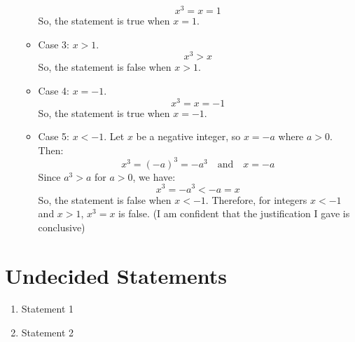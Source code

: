 \documentclass{article}
\begin{document}
\begin{enumerate}
\begin{itemize}
                    \[
                        x^3 = x = 1
                    \]
                    So, the statement is true when $x = 1$.
              \item Case 3: $x > 1$.
                    \[
                        x^3 > x
                    \]
                    So, the statement is false when $x > 1$.
              \item Case 4: $x = -1$.
                    \[
                        x^3 = x = -1
                    \]
                    So, the statement is true when $x = -1$.
              \item Case 5: $x < -1$.
                    Let \(x\) be a negative integer, so \(x = -a\) where \(a > 0\).
                    Then:
                    \[
                        x^3 = {(-a)}^3 = -a^3 \quad \text{and} \quad x = -a
                    \]
                    Since \(a^3 > a\) for \(a > 0\), we have:
                    \[
                        x^3 = -a^3 < -a = x
                    \]
                    So, the statement is false when $x < -1$.\newline
                    Therefore, for integers \(x < -1\) and \(x > 1\), \(x^3 = x\) is false.\newline
                    (I am confident that the justification I gave is conclusive)
          \end{itemize}
\end{enumerate}

\section{Undecided Statements}

\begin{enumerate}
    \item Statement 1
    \item Statement 2
\end{enumerate}
\end{document}
